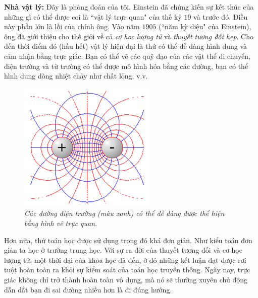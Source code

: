\begin{multicols}{2}
	\vskip 0.1cm
	\textbf{\color{quantoan}Nhà vật lý:} Đây là phỏng đoán của tôi. Einstein đã chứng kiến sự kết thúc của những gì có thể được coi là ``vật lý trực quan" của thế kỷ $19$ và trước đó. Điều này phần lớn là lỗi của chính ông. Vào năm $1905$ (``năm kỳ diệu" của Einstein), ông đã giới thiệu cho thế giới về cả \textit{cơ học lượng tử} và \textit{thuyết tương đối hẹp}. Cho đến thời điểm đó (hầu hết) vật lý hiện đại là thứ có thể dễ dàng hình dung và cảm nhận bằng trực giác. Bạn có thể vẽ các quỹ đạo của các vật thể di chuyển, điện trường và từ trường có thể được mô hình hóa bằng các đường, bạn có thể hình dung dòng nhiệt chảy như chất lỏng, v.v.
	\begin{figure}[H]
		\vspace*{-5pt}
		\centering
		\captionsetup{labelformat= empty, justification=centering}
		\includegraphics[width= 0.95\linewidth]{1}
		\caption{\small\textit{\color{quantoan}Các đường điện trường (màu xanh) có thể dễ dàng được thể hiện bằng hình vẽ trực quan.}}
		\vspace*{-10pt}
	\end{figure}
	Hơn nữa, thứ toán học được sử dụng trong đó khá đơn giản. Như kiểu toán đơn giản ta học ở  trường trung học. Với sự ra đời của thuyết tương đối và cơ học lượng tử, một thời đại của khoa học đã đến, ở đó những kết luận đạt được rơi tuột hoàn toàn ra khỏi sự kiểm soát của toán học truyền thống. Ngày nay, trực giác không chỉ trở thành hoàn toàn vô dụng, mà nó sẽ thường xuyên chủ động dẫn dắt bạn đi sai đường nhiều hơn là đi đúng hướng.

\end{multicols}
